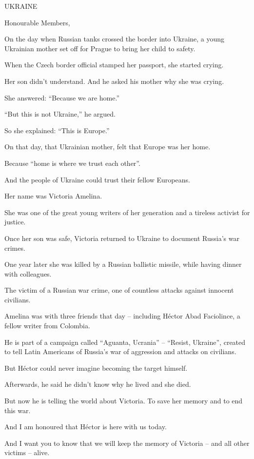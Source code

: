 \documentclass[a4paper,11pt]{article}
\begin{document}
 

UKRAINE

Honourable Members,

On the day when Russian tanks crossed the border into Ukraine, a young Ukrainian mother set off for Prague to bring her child to safety.

When the Czech border official stamped her passport, she started crying.

Her son didn't understand. And he asked his mother why she was crying.

She answered: “Because we are home.”

“But this is not Ukraine,” he argued.

So she explained: “This is Europe.”

On that day, that Ukrainian mother, felt that Europe was her home.

Because “home is where we trust each other”.

And the people of Ukraine could trust their fellow Europeans.

Her name was Victoria Amelina.

She was one of the great young writers of her generation and a tireless activist for justice.

Once her son was safe, Victoria returned to Ukraine to document Russia's war crimes.

One year later she was killed by a Russian ballistic missile, while having dinner with colleagues.

The victim of a Russian war crime, one of countless attacks against innocent civilians.

Amelina was with three friends that day – including Héctor Abad Faciolince, a fellow writer from Colombia.

He is part of a campaign called “Aguanta, Ucrania” – “Resist, Ukraine”, created to tell Latin Americans of Russia's war of aggression and attacks on civilians.

But Héctor could never imagine becoming the target himself.

Afterwards, he said he didn't know why he lived and she died.

But now he is telling the world about Victoria. To save her memory and to end this war.

And I am honoured that Héctor is here with us today.

And I want you to know that we will keep the memory of Victoria – and all other victims – alive.
\end{document}
